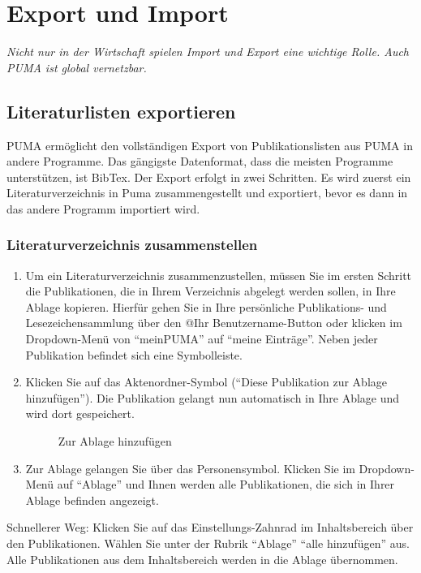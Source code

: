 \chapter{Export und Import}
\textit{Nicht nur in der Wirtschaft spielen Import und Export eine wichtige Rolle. Auch PUMA ist global vernetzbar.}
\section{Literaturlisten exportieren}
PUMA ermöglicht den vollständigen Export von Publikationslisten aus PUMA in andere Programme. Das gängigste Datenformat, dass die meisten Programme unterstützen, ist BibTex. \newline 
Der Export erfolgt in zwei Schritten. Es wird zuerst ein Literaturverzeichnis in Puma zusammengestellt und exportiert, bevor es dann in das andere Programm importiert wird.
\subsection{Literaturverzeichnis zusammenstellen}
\begin{enumerate}
    \item Um ein Literaturverzeichnis zusammenzustellen, müssen Sie im ersten Schritt die Publikationen, die in Ihrem Verzeichnis abgelegt werden sollen, in Ihre Ablage kopieren. Hierfür gehen Sie in Ihre persönliche Publikations- und Lesezeichensammlung über den @Ihr Benutzername-Button oder klicken im Dropdown-Menü von \enquote{meinPUMA} auf \enquote{meine Einträge}.  Neben jeder Publikation befindet sich eine Symbolleiste.
    \item Klicken Sie auf das Aktenordner-Symbol (\enquote{Diese Publikation zur Ablage hinzufügen}). Die Publikation gelangt nun automatisch in Ihre Ablage und wird dort gespeichert.
\begin{figure}[h!]
 \centering
 \caption{Zur Ablage hinzufügen}
 \label{figure039}
\end{figure}
    \item Zur Ablage gelangen Sie über das Personensymbol. Klicken Sie im Dropdown-Menü auf \enquote{Ablage} und Ihnen werden alle Publikationen, die sich in Ihrer Ablage befinden angezeigt. 
\end{enumerate} 
Schnellerer Weg: Klicken Sie auf das Einstellungs-Zahnrad im Inhaltsbereich über den Publikationen. Wählen Sie unter der Rubrik \enquote{Ablage} \enquote{alle hinzufügen} aus. Alle Publikationen aus dem Inhaltsbereich werden in die Ablage übernommen. 
